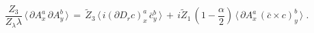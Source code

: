\begin{equation}
  \label{ghDSE2}
   \frac{Z_3}{Z_\lambda \lambda} \,  \langle \,
      \partial A^a_x \, \partial A^b_y \, \rangle \, = \,  
       \widetilde Z_3 \,  \langle  \, i (\partial D_r c)^a_x \, \bar c^b_y\,
  \rangle \,  + \, i\widetilde Z_1 \, (1-\frac \alpha 2) \, 
  \langle \, \partial A^a_x \,
      (\bar c \times c )^b_y \, \rangle \;.
\end{equation}

